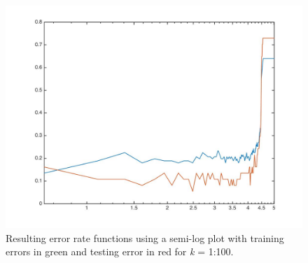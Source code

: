 \documentclass[a4paper, 11pt]{article}
\begin{document}
\begin{enumerate}[(a)]
\begin{figure}
\includegraphics[scale=0.25]{errorrate2.jpg}
\caption[Error3]{Resulting error rate functions using a semi-log plot with training errors in green and testing error in red for \textit{k} = 1:100.}
\label{fig:errorrate2}
\end{figure}
\end{enumerate}
\vspace{-10pt}
\end{document}
